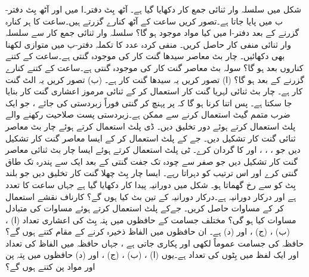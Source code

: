 شکل     میں سلسلہ وار ثنائی جمع کار دکھایا گیا ہے۔ آٹھ بِٹ دفتر۔ا  میں   اور  آٹھ بِٹ دفتر-ب   میں  پایا جاتا ہے۔تصور کریں  ساعت کے آٹھ کنارے گزرتے ہیں۔ساعت کا ہر کنارہ گزرنے کے بعد دفتر-ا میں  کیا مواد موجود ہو گا؟
 سلسلہ وار ثنائی جمع کار سے سلسلہ وار ثنائی منفی کار حاصل کریں۔ منفی  کردہ عدد کا تکملہ  دفتر-ب میں متوازی لکھنا بھی دکھائیں۔
 چار بٹ معاصر سیدھا گنت کار کی موجودہ گنتی   ہے۔ساعت کے کتنے کناروں بعد   ہو گا؟
 سولہ بٹ معاصر گنت کار کی موجودہ گنتی  ہے۔ساعت کے کتنے کنارے گزرنے کے بعد  ہو گا؟ (ا) تصور کریں یہ سیدھا گنت کار ہے۔ (ب) تصور کریں یہ الٹ گنت کار ہے۔
 چار بٹ ثنائی لہریا گنت کار  استعمال کر کے  ثنائی مرموز اعشاری گنت کار  بنایا جا سکتا ہے۔ پس اتنا کرنا ہو گا کہ  پر پہنچ کر  گنتی   فوراً زبردستی  کی جائے ، جو ایک  ضرب متمم گیٹ استعمال  کرنے سے  ممکن ہے۔زبردستی پست صلاحیت رکھنے والے پلٹ استعمال کرتے ہوئے   دور تخلیق دیں۔ 
 ڈی پلٹ استعمال کرتے ہوئے چار بٹ معاصر ثنائی گنت کار تشکیل دیں۔ 
 جے کے پلٹ استعمال کر کے  ایسا معاصر گنت کار تشکیل دیں  جو   ، ، ، اور    کا گردان کرے۔
 ٹی پلٹ استعمال کرتے ہوئے ایسا  چار بٹ ثنائی معاصر گنت کار تشکیل دیں جو صفر   سے چودہ   تک جفت گنتی کے بعد ایک   سے پندرہ   تک طاق گنتی کرے اور اس ترتیب کو دہراتا رہے۔ 
ایسا چار بِٹ چھلا گنت کار تخلیق دیں جو بلند بِٹ کو  سے  رخ گھماتا ہو۔
 شکل  میں دورانیہ پیدا کار دکھایا گیا ہے جہاں  ساعت کا تعدد  ہے اور درکار دورانیہ   ہے۔درکار دورانیہ کے تین بٹ کیا ہوں گے؟
 کارناف نقشے  استعمال  کر کے  مساوات  حاصل کریں۔
جےکے پلٹ استعمال کرتے ہوئے  مساوات   کی متبادل مساوات   کیا ہو گی؟
  مختلف جسامت کے حافظوں میں پتہ بِٹ  کی  اعشاری تعداد  (ا) ، (ب) ، (ج) ، اور  (د)  ہے۔  ان حافظوں میں الفاظ ذخیرہ کرنے کے  مقام کتنے  ہوں گے؟
 حافظہ کی  جسامت  عموماً  لکھی اور پکاری جاتی ہے ، جہاں   حافظہ میں الفاظ کی تعداد اور  ایک لفظ میں بِٹوں کی تعداد  ہے۔یوں  (ا) ،  (ب)   ، (ج)  ، اور (د)     حافظوں میں پتہ پن  اور  مواد پن کتنے  ہوں گے؟
